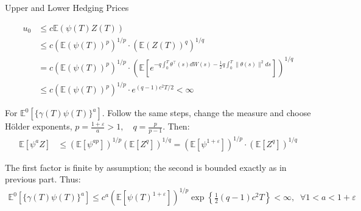 \documentclass{beamer}
\begin{document}
\begin{frame}{Upper and Lower Hedging Prices}

    {\footnotesize \footnotesize
    \par \begin{align*}
        u_0 &\leq c\mathbb{E}(\psi(T)Z(T)) \\
        &\leq c(\mathbb{E}(\psi(T))^p)^{1/p} \cdot (\mathbb{E}(Z(T))^q)^{1/q} \\
        &= c(\mathbb{E}(\psi(T))^p)^{1/p} \cdot \left( \mathbb{E}\left[ e^{ -q \int_0^T \theta^\top(s)dW(s) -
         \frac{1}{2} q \int_0^T \|\theta(s)\|^2 ds } \right] \right)^{1/q} \\
        &\leq c(\mathbb{E}(\psi(T))^p)^{1/p} \cdot e^{(q-1)c^2 T/2} < \infty
        \end{align*}
    \par  \pause For $\mathbb{E}^0[\{\gamma(T)\psi(T)\}^a]$. Follow the same steps, change the measure and choose Hölder exponents, 
    $ p = \frac{1 + \varepsilon}{a} > 1, \quad q = \frac{p}{p - 1}$. Then:
    \begin{align*}
        \mathbb{E}[\psi^a Z] &\leq \left( \mathbb{E}[\psi^{ap}] \right)^{1/p} \left( \mathbb{E}[Z^q] \right)^{1/q}=
         \left( \mathbb{E}[\psi^{1 + \varepsilon}] \right)^{1/p} \cdot \left( \mathbb{E}[Z^q] \right)^{1/q}
    \end{align*}
    \par  The first factor is finite by assumption; the second is bounded exactly as in previous part. Thus:
    \begin{align*}
        \mathbb{E}^0[\{\gamma(T)\psi(T)\}^a] \leq c^a \left( \mathbb{E}[\psi(T)^{1 + \varepsilon}] \right)^{1/p} \exp \left\{ \frac{1}{2}(q - 1)c^2T \right\} < \infty
        ,\;\;\forall 1 < a < 1 + \varepsilon
    \end{align*}
    }
\end{frame} 
\end{document}

